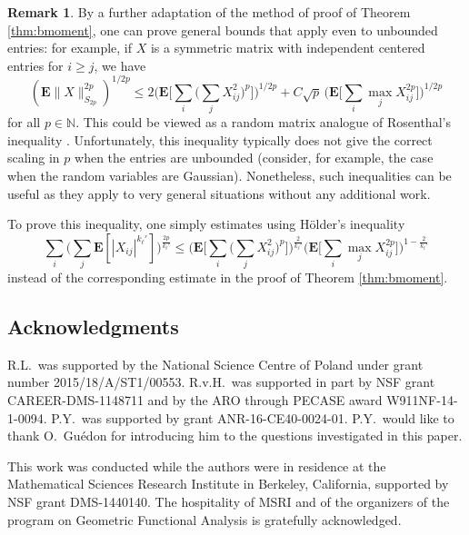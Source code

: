 \documentclass[10pt,reqno]{amsart}
\theoremstyle{definition}
\newtheorem{rem}[thm]{Remark}
\numberwithin{equation}{section}
\numberwithin{figure}{section}
\numberwithin{table}{section}
\begin{document}
\begin{rem}
By a further adaptation of the method of proof of Theorem 
\ref{thm:bmoment}, one can prove general bounds that apply even to 
unbounded entries: for example, if $X$ is a symmetric matrix with 
independent centered entries for $i\ge j$, we have
$$
	(\mathbf{E}\|X\|_{S_{2p}}^{2p})^{1/2p} \le
	2\Bigg(
	\mathbf{E}
	\Bigg[\sum_i
	\Bigg(\sum_j 
	X_{ij}^2\Bigg)^p\Bigg]\Bigg)^{1/2p} +
	C\sqrt{p}\,
	\Bigg(\mathbf{E}\Bigg[\sum_i\max_j X_{ij}^{2p}\Bigg]
	\Bigg)^{1/2p}
$$
for all $p\in\mathbb{N}$. This could be viewed as a random matrix analogue 
of Rosenthal's inequality \cite[Theorem 15.10]{BLM13}.
Unfortunately, this inequality typically does not give the correct scaling 
in $p$ when the entries are unbounded (consider, for example, the
case when the random variables are Gaussian). Nonetheless, such 
inequalities can be useful as they apply to very general situations 
without any additional work.

To prove this inequality, one simply 
estimates using H\"older's inequality
$$
	\sum_i \Bigg( \sum_j
        \mathbf{E}[|X_{ij}|^{k_\ell'}]\Bigg)^{\frac{2p}{k_\ell'}} 
	\le
	\Bigg(\mathbf{E}\Bigg[\sum_i\Bigg(\sum_j X_{ij}^2\Bigg)^p\Bigg]
	\Bigg)^{\frac{2}{k_\ell'}}
	\Bigg(\mathbf{E}\Bigg[\sum_i\max_j X_{ij}^{2p}\Bigg]
	\Bigg)^{1-\frac{2}{k_\ell'}}
$$
instead of the corresponding estimate in the proof of Theorem 
\ref{thm:bmoment}.
\end{rem}


\subsection*{Acknowledgments}
R.L.\ was supported by the National Science Centre of Poland under grant 
number 2015/18/A/ST1/00553. R.v.H.\ was supported in part by NSF grant 
CAREER-DMS-1148711 and by the ARO through PECASE award W911NF-14-1-0094. 
P.Y.\ was supported by grant ANR-16-CE40-0024-01. P.Y.\ would like to
thank O.\ Gu\'edon for introducing him to the questions investigated
in this paper.

This work was conducted while the authors were in residence at the 
Mathematical Sciences Research Institute in Berkeley, California, 
supported by NSF grant DMS-1440140. The hospitality of MSRI and of the 
organizers of the program on Geometric Functional Analysis is gratefully 
acknowledged.

%
%
\end{document}
